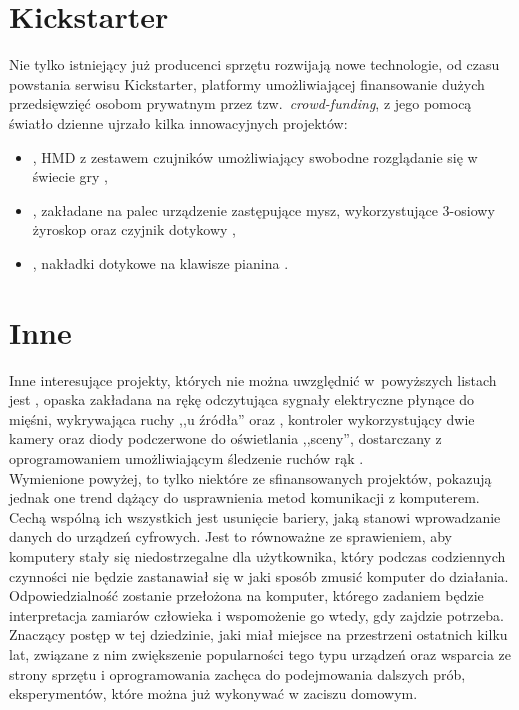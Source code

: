 \section{Kickstarter}

Nie tylko istniejący już producenci sprzętu rozwijają nowe technologie, od czasu powstania serwisu Kickstarter, platformy umożliwiającej finansowanie dużych przedsięwzięć osobom prywatnym przez tzw.\ \textit{crowd-funding}, z jego pomocą światło dzienne ujrzało kilka innowacyjnych projektów:
\begin{itemize}
 \item {}, HMD z zestawem czujników umożliwiający swobodne rozglądanie się w świecie gry \cite{oculus},
 \item {}, zakładane na palec urządzenie zastępujące mysz, wykorzystujące 3-osiowy żyroskop oraz czyjnik dotykowy \cite{mycestro},
 \item {}, nakładki dotykowe na klawisze pianina \cite{touchkeys}.\\
\end{itemize}

\section{Inne}

Inne interesujące projekty, których nie można uwzględnić w~powyższych listach jest , opaska zakładana na rękę odczytująca sygnały elektryczne płynące do mięśni, wykrywająca ruchy ,,u źródła'' \cite{myo} oraz , kontroler wykorzystujący dwie kamery oraz diody podczerwone do oświetlania ,,sceny'', dostarczany z oprogramowaniem umożliwiającym śledzenie ruchów rąk \cite{leap}.\\

Wymienione powyżej, to tylko niektóre ze sfinansowanych projektów, pokazują jednak one trend dążący do usprawnienia metod komunikacji z komputerem. Cechą wspólną ich wszystkich jest usunięcie bariery, jaką stanowi wprowadzanie danych do urządzeń cyfrowych. Jest to równoważne ze sprawieniem, aby komputery stały się niedostrzegalne dla użytkownika, który podczas codziennych czynności nie będzie zastanawiał się w jaki sposób zmusić komputer do działania. Odpowiedzialność zostanie przełożona na komputer, którego zadaniem będzie interpretacja zamiarów człowieka i wspomożenie go wtedy, gdy zajdzie potrzeba.\\

Znaczący postęp w tej dziedzinie, jaki miał miejsce na przestrzeni ostatnich kilku lat, związane z nim zwiększenie popularności tego typu urządzeń oraz wsparcia ze strony sprzętu i oprogramowania zachęca do podejmowania dalszych prób, eksperymentów, które można już wykonywać w zaciszu domowym.
